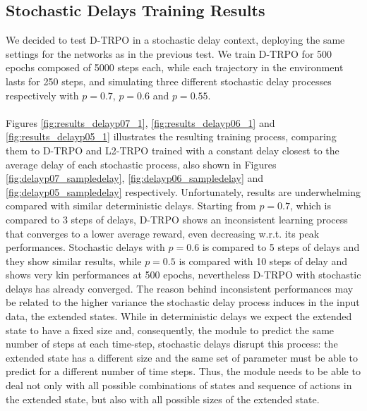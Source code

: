         \subsection{Stochastic Delays Training Results}
        \label{sub:res_stoch_delays}
            We decided to test D-TRPO in a stochastic delay context, deploying the same settings for the networks as in the previous test. We train D-TRPO for 500 epochs composed of 5000 steps each, while each trajectory in the environment lasts for 250 steps, and simulating three different stochastic delay processes respectively with $p=0.7$, $p=0.6$ and $p=0.55$.
            \\\\
            Figures \ref{fig:results_delayp07_1}, \ref{fig:results_delayp06_1} and \ref{fig:results_delayp05_1} illustrates the resulting training process, comparing them to D-TRPO and L2-TRPO trained with a constant delay closest to the average delay of each stochastic process, also shown in Figures \ref{fig:delayp07_sampledelay}, \ref{fig:delayp06_sampledelay} and \ref{fig:delayp05_sampledelay} respectively. Unfortunately, results are underwhelming compared with similar deterministic delays. Starting from $p=0.7$, which is compared to 3 steps of delays, D-TRPO shows an inconsistent learning process that converges to a lower average reward, even decreasing w.r.t. its peak performances. Stochastic delays with $p=0.6$ is compared to 5 steps of delays and they show similar results, while $p=0.5$ is compared with 10 steps of delay and shows very kin performances at 500 epochs, nevertheless D-TRPO with stochastic delays has already converged.
            The reason behind inconsistent performances may be related to the higher variance the stochastic delay process induces in the input data, the extended states. While in deterministic delays we expect the extended state to have a fixed size and, consequently, the module to predict the same number of steps at each time-step, stochastic delays disrupt this process: the extended state has a different size and the same set of parameter must be able to predict for a different number of time steps. Thus, the module needs to be able to deal not only with all possible combinations of states and sequence of actions in the extended state, but also with all possible sizes of the extended state. 
            
